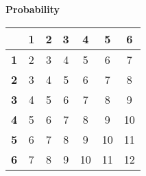 \documentclass[a4paper,12pt]{article}
\begin{document}
\LARGE
\noindent \textbf{Probability}


\begin{center}
	\begin{tabular}{|c||c|c|c|c|c|c|}
		\hline
		\phantom{space}	& \phantom{sp} \textbf{1}\phantom{sp}	&\phantom{sp} \textbf{2}\phantom{sp}&\phantom{sp} \textbf{3}\phantom{sp}	&\phantom{sp} \textbf{4}	\phantom{sp}&\phantom{sp} \textbf{5} \phantom{sp}&\phantom{sp}\textbf{6}	\phantom{sp}\\ \hline	\hline
		\textbf{1}	&	2	&	3	&	4	&	5	&	6	&	7	 \\ \hline	
		\textbf{2}	&	3	&	4	&	5	&	6	&	7	&	8	 \\ \hline	
		\textbf{3}	&	4	&	5	&	6	&	7	&	8	&	9	 \\ \hline	
		\textbf{4}	&	5	&	6	&	7	&	8	&	9	&	10	 \\ \hline	
		\textbf{5}	&	6	&	7	&	8	&	9	&	10	&	11	 \\ \hline	
		\textbf{6}	&	7	&	8	&	9	&	10	&	11	&	12	 \\ \hline	
	\end{tabular}
\end{center}


\end{document}
